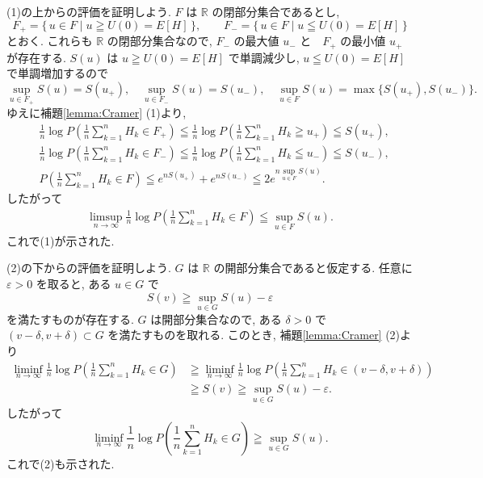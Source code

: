 \documentclass[12pt,twoside]{jarticle}
\makeatletter
\newcommand\R{{\mathbb R}} %
\newcommand\eps{\varepsilon}
\theoremstyle{jplain}
\theoremstyle{jplain}
\theoremstyle{jplain}
\numberwithin{theorem}{section}
\numberwithin{equation}{section}
\numberwithin{figure}{section}
\numberwithin{table}{section}
\newcommand\theoremref[1]{定理\ref{#1}}
\newcommand\lemmaref[1]{補題\ref{#1}}
\renewenvironment{proof}[1][\proofname]{\par
  \normalfont
  \topsep6\p@\@plus6\p@ \trivlist
  \item[\hskip\labelsep{\bfseries #1}\@addpunct{\bfseries.}]\ignorespaces
}{%
  \endtrivlist
}
\renewcommand{\proofname}{証明}
\makeatother
\begin{document}
\begin{proof}[\theoremref{theorem:Cramer}の証明]
(1)の上からの評価を証明しよう.
$F$ は $\R$ の閉部分集合であるとし,
\[
F_+=\{\,u\in F\mid u\geqq U(0)=E[H]\,\}, \qquad
F_-=\{\,u\in F\mid u\leqq U(0)=E[H]\,\}
\]
とおく. これらも $\R$ の閉部分集合なので,
$F_-$ の最大値 $u_-$ と　$F_+$ の最小値 $u_+$ が存在する.
$S(u)$ は $u\geqq U(0)=E[H]$ で単調減少し,
$u\leqq U(0)=E[H]$ で単調増加するので
\[
\sup_{u\in F_+}S(u) = S(u_+), \quad
\sup_{u\in F_-}S(u) = S(u_-), \quad
\sup_{u\in F}S(u) = \max\{S(u_+),S(u_-)\}.
\]
ゆえに\lemmaref{lemma:Cramer} (1)より,
\begin{align*}
&
\frac{1}{n}\log
P\left(\frac{1}{n}\sum_{k=1}^n H_k\in F_+\right)
\leqq
\frac{1}{n}\log
P\left(\frac{1}{n}\sum_{k=1}^n H_k\geqq u_+\right)
\leqq
S(u_+),
\\ &
\frac{1}{n}\log
P\left(\frac{1}{n}\sum_{k=1}^n H_k\in F_-\right)
\leqq
\frac{1}{n}\log
P\left(\frac{1}{n}\sum_{k=1}^n H_k\leqq u_-\right)
\leqq
S(u_-),
\\ &
P\left(\frac{1}{n}\sum_{k=1}^n H_k\in F\right)
\leqq e^{n S(u_+)}+e^{n S(u_-)}
\leqq 2e^{n \sup_{u\in F}S(u)}.
\end{align*}
したがって
\begin{align*}
\limsup_{n\to\infty}
\frac{1}{n}\log
P\left(\frac{1}{n}\sum_{k=1}^n H_k\in F\right)
\leqq \sup_{u\in F}S(u).
\end{align*}
これで(1)が示された.

(2)の下からの評価を証明しよう.
$G$ は $\R$ の開部分集合であると仮定する.
任意に $\eps>0$ を取ると, ある $u\in G$ で
\[
S(v)\geqq \sup_{u\in G}S(u)-\eps
\]
を満たすものが存在する.
$G$ は開部分集合なので, ある $\delta>0$
で $(v-\delta,v+\delta)\subset G$ を満たすものを取れる.
このとき, \lemmaref{lemma:Cramer} (2)より
\begin{align*}
\liminf_{n\to\infty}
\frac{1}{n}\log
P\left(\frac{1}{n}\sum_{k=1}^n H_k\in G\right)
&
\geqq
\liminf_{n\to\infty}
\frac{1}{n}\log
P\left(\frac{1}{n}\sum_{k=1}^n H_k\in (v-\delta,v+\delta)\right)
\\ &
\geqq S(v)
\geqq \sup_{u\in G} S(u)-\eps.
\end{align*}
したがって
\[
\liminf_{n\to\infty}
\frac{1}{n}\log
P\left(\frac{1}{n}\sum_{k=1}^n H_k\in G\right)
\geqq
\sup_{u\in G} S(u).
\]
これで(2)も示された.


\end{proof}
\end{document}
